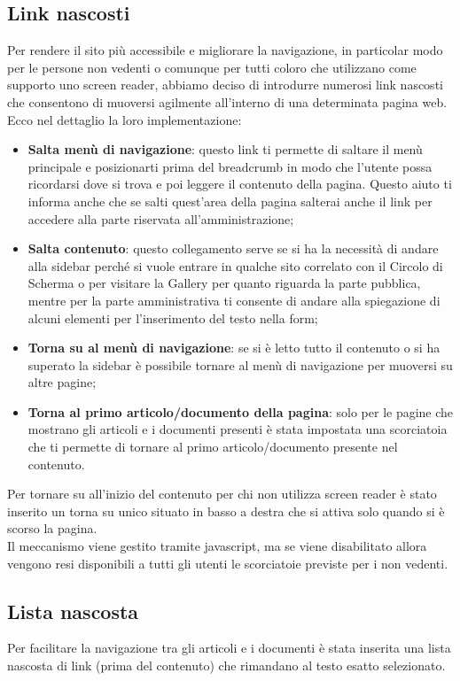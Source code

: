 \subsection{Link nascosti}
Per rendere il sito pi\`u accessibile e migliorare la navigazione, in particolar modo per le persone non vedenti o comunque per tutti coloro che utilizzano come supporto uno screen reader, abbiamo deciso di introdurre numerosi link nascosti che consentono di muoversi agilmente all'interno di una determinata pagina web. \\
Ecco nel dettaglio la loro implementazione:
	\begin{itemize}
		\item \textbf{Salta men\`u di navigazione}: questo link ti permette di saltare il men\`u principale e posizionarti prima del breadcrumb in modo che l'utente possa ricordarsi dove si trova e poi leggere il contenuto della pagina. Questo aiuto ti informa anche che se salti quest'area della pagina salterai anche il link per accedere alla parte riservata all'amministrazione;
		\item \textbf{Salta contenuto}: questo collegamento serve se si ha la necessit\`a di andare alla sidebar perch\'e si vuole entrare in qualche sito correlato con il Circolo di Scherma o per visitare la Gallery per quanto riguarda la parte pubblica, mentre per la parte amministrativa ti consente di andare alla spiegazione di alcuni elementi per l'inserimento del testo nella form;
		\item \textbf{Torna su al men\`u di navigazione}: se si \`e letto tutto il contenuto o si ha superato la sidebar \`e possibile tornare al men\`u di navigazione per muoversi su altre pagine;
		\item \textbf{Torna al primo articolo/documento della pagina}: solo per le pagine che mostrano gli articoli e i documenti presenti \`e stata impostata una scorciatoia che ti permette di tornare al primo articolo/documento presente nel contenuto.
 
	\end{itemize}
Per tornare su all'inizio del contenuto per chi non utilizza screen reader \`e stato inserito un torna su unico situato in basso a destra che si attiva solo quando si \`e scorso la pagina.
\\ Il meccanismo viene gestito tramite javascript, ma se viene disabilitato allora vengono resi disponibili a tutti gli utenti le scorciatoie previste per i non vedenti.

\subsection{Lista nascosta}
Per facilitare la navigazione tra gli articoli e i documenti \`e stata inserita una lista nascosta di link (prima del contenuto) che rimandano al testo esatto selezionato.

